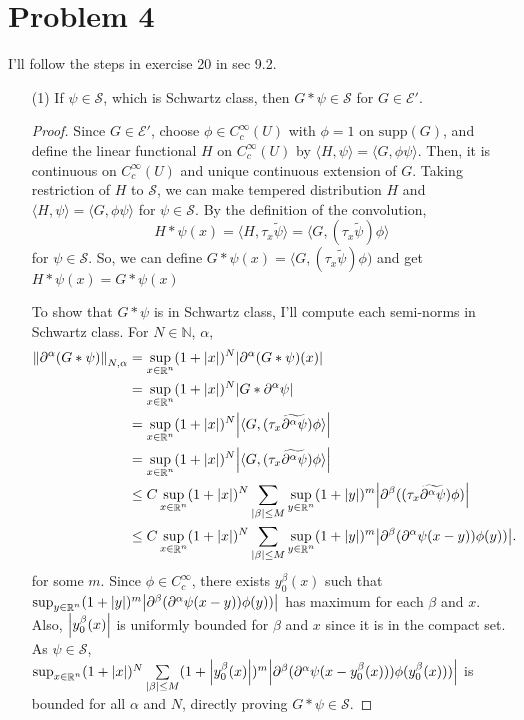 \documentclass{article}
\DeclareMathOperator{\rr}{\mathbb{R}}
\begin{document}
\section*{Problem 4}
I'll follow the steps in exercise 20 in sec 9.2.
\begin{enumerate}
\item[(1)] If $\psi\in \mathcal{S}$, which is Schwartz class, then $G*\psi\in \mathcal{S}$ for $G\in \mathcal{E}'$.
\begin{proof}
Since $G\in \mathcal{E}'$, choose $\phi\in C_c^\infty(U)$ with $\phi=1$ on $\text{supp}(G)$, and define the linear functional $H$ on $C_c^\infty(U)$ by $\langle H,\psi \rangle=\langle G,\phi\psi\rangle$. Then, it is continuous on $C_c^\infty(U)$ and unique continuous extension of $G$. Taking restriction of $H$ to $\mathcal{S}$, we can make tempered distribution $H$ and $\langle H, \psi\rangle=\langle G, \phi\psi\rangle$ for $\psi\in \mathcal{S}$. 
By the definition of the convolution,
\begin{equation*}
H*\psi(x)=\langle H, \tau_x \tilde{\psi}\rangle=\langle G, (\tau_x\tilde{\psi})\phi\rangle
\end{equation*}
for $\psi\in \mathcal{S}$. So, we can define $G*\psi(x)=\langle G, (\tau_x\tilde{\psi})\phi)$ and get $H*\psi(x)=G*\psi(x)$

To show that $G*\psi$ is in Schwartz class, I'll compute each semi-norms in Schwartz class. For $N\in\mathbb{N}$, $\alpha$,
\begin{equation*}
\begin{split}
\norm{\partial^\alpha(G*\psi)}_{N,\alpha}&=\sup_{x\in \rr^n}(1+\abs{x})^N\abs{\partial^\alpha(G*\psi)(x)}\\
&=\sup_{x\in \rr^n}(1+\abs{x})^N\abs{G*\partial^\alpha\psi} \\
&=\sup_{x\in \rr^n}(1+\abs{x})^N\abs{\langle G, (\tau_x \widetilde{\partial^\alpha\psi})\phi\rangle} \\
&=\sup_{x\in \rr^n}(1+\abs{x})^N\abs{\langle G, (\tau_x \widetilde{\partial^\alpha\psi})\phi\rangle} \\
&\leq C\sup_{x\in \rr^n}(1+\abs{x})^N\sum\limits_{\abs{\beta}\leq M}\sup_{y\in \rr^n}(1+\abs{y})^m\abs{ \partial^\beta((\tau_x\widetilde{\partial^\alpha\psi})\phi)} \\
&\leq C\sup_{x\in \rr^n}(1+\abs{x})^N\sum\limits_{\abs{\beta}\leq M}\sup_{y\in \rr^n}(1+\abs{y})^m\abs{ \partial^\beta(\partial^\alpha\psi(x-y))\phi(y))}.
\end{split}
\end{equation*}
for some $m$. Since $\phi\in C_c^\infty$, there exists $y^\beta_0(x)$ such that $\sup_{y\in \rr^n}(1+\abs{y})^m\abs{ \partial^\beta(\partial^\alpha\psi(x-y))\phi(y))}$ has maximum for each $\beta$ and $x$. Also, $\abs{y^\beta_0(x)}$ is uniformly bounded for $\beta$ and $x$ since it is in the compact set. As $\psi\in \mathcal{S}$, $\sup_{x\in \rr^n}(1+\abs{x})^N\sum\limits_{\abs{\beta}\leq M}(1+\abs{y_0^\beta(x)})^m\abs{ \partial^\beta(\partial^\alpha\psi(x-y_0^\beta(x)))\phi(y_0^\beta(x)))}$ is bounded for all $\alpha$ and $N$, directly proving $G*\psi
\in \mathcal{S}$.


\end{proof}
\end{enumerate}
\end{document}
